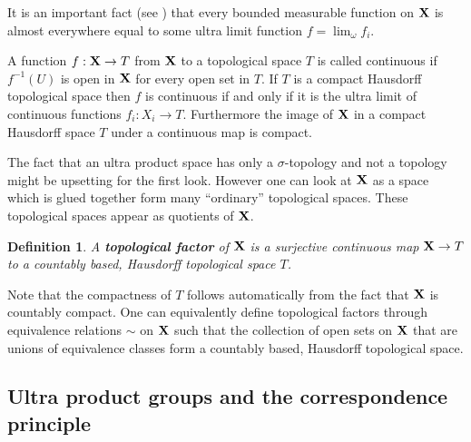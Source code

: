 \documentclass [11pt] {article}
\newtheorem{definition}{Definition}[section]
\def\to{\rightarrow}
\def\bX{{\bf X}}
\begin{document}
\medskip

 It is an important fact (see \cite{ESz}) that every bounded measurable function on $\bX$ is almost everywhere equal to some ultra limit function $f=\lim_\omega f_i$. 

\medskip


 A function $f:\bX\rightarrow T$ from $\bX$ to a topological space $T$ is called continuous if $f^{-1}(U)$ is open in $\bX$ for every open set in $T$. If $T$ is a compact Hausdorff topological space then $f$ is continuous if and only if it is the ultra limit of continuous functions $f_i:X_i\rightarrow T$. Furthermore the image of $\bX$ in a compact Hausdorff space $T$ under a continuous map is compact. 

\medskip

The fact that an ultra product space has only a $\sigma$-topology and not a topology might be upsetting for the first look. However one can look at $\bX$ as a space which is glued together form many ``ordinary'' topological spaces. These topological spaces appear as quotients of $\bX$.

\begin{definition} A {\bf topological factor} of $\bX$ is a surjective continuous map $\bX\rightarrow T$ to a countably based, Hausdorff topological space $T$.
\end{definition}

Note that the compactness of $T$ follows automatically from the fact that $\bX$ is countably compact. One can equivalently define topological factors through equivalence relations $\sim$ on $\bX$ such that the collection of open sets on $\bX$ that are unions of equivalence classes form a countably based, Hausdorff topological space.  


\subsection{Ultra product groups and the correspondence principle}
\end{document}
